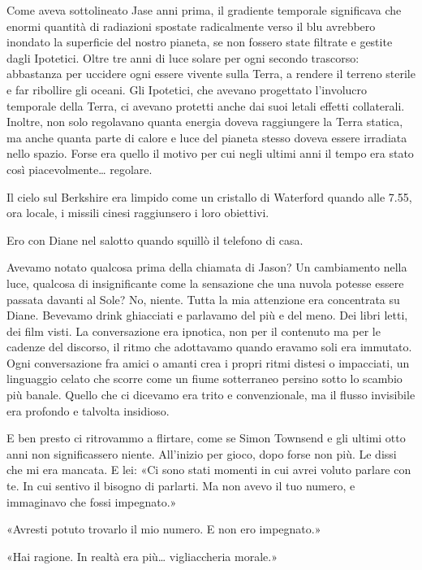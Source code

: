 Come aveva sottolineato Jase anni prima, il gradiente temporale
significava che enormi quantità di radiazioni spostate radicalmente
verso il blu avrebbero inondato la superficie del nostro pianeta, se non
fossero state filtrate e gestite dagli Ipotetici. Oltre tre anni di luce
solare per ogni secondo trascorso: abbastanza per uccidere ogni essere
vivente sulla Terra, a rendere il terreno sterile e far ribollire gli
oceani. Gli Ipotetici, che avevano progettato l'involucro temporale
della Terra, ci avevano protetti anche dai suoi letali effetti
collaterali. Inoltre, non solo regolavano quanta energia doveva
raggiungere la Terra statica, ma anche quanta parte di calore e luce del
pianeta stesso doveva essere irradiata nello spazio. Forse era quello il
motivo per cui negli ultimi anni il tempo era stato così
piacevolmente\ldots{} regolare.

Il cielo sul Berkshire era limpido come un cristallo di Waterford quando
alle 7.55, ora locale, i missili cinesi raggiunsero i loro obiettivi.

\separatorefiori

Ero con Diane nel salotto quando squillò il telefono di casa.

Avevamo notato qualcosa prima della chiamata di Jason? Un cambiamento
nella luce, qualcosa di insignificante come la sensazione che una nuvola
potesse essere passata davanti al Sole? No, niente. Tutta la mia
attenzione era concentrata su Diane. Bevevamo drink ghiacciati e
parlavamo del più e del meno. Dei libri letti, dei film visti. La
conversazione era ipnotica, non per il contenuto ma per le cadenze del
discorso, il ritmo che adottavamo quando eravamo soli era immutato. Ogni
conversazione fra amici o amanti crea i propri ritmi distesi o
impacciati, un linguaggio celato che scorre come un fiume sotterraneo
persino sotto lo scambio più banale. Quello che ci dicevamo era trito e
convenzionale, ma il flusso invisibile era profondo e talvolta
insidioso.

E ben presto ci ritrovammo a flirtare, come se Simon Townsend e gli
ultimi otto anni non significassero niente. All'inizio per gioco, dopo
forse non più. Le dissi che mi era mancata. E lei: «Ci sono stati
momenti in cui avrei voluto parlare con te. In cui sentivo il bisogno di
parlarti. Ma non avevo il tuo numero, e immaginavo che fossi impegnato.»

«Avresti potuto trovarlo il mio numero. E non ero impegnato.»

«Hai ragione. In realtà era più\ldots{} vigliaccheria morale.»

